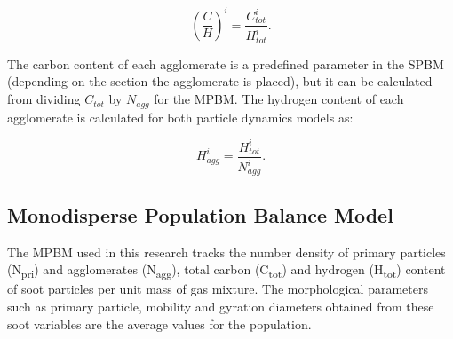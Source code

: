 \begin{equation}
	\left(
		\frac{C}{H}
	\right)^i
	=\frac{C^i_{tot}}{H^i_{tot}}   
	\label{eqn:CtoH}.
\end{equation}

The carbon content of each agglomerate is a predefined parameter in the SPBM (depending on the section the agglomerate is placed), but it can be calculated from dividing ${C_{tot}}$ by ${N_{agg}}$ for the MPBM. The hydrogen content of each agglomerate is calculated for both particle dynamics models as:

\begin{equation}
	H^i_{agg}
	=\frac{H^i_{tot}}{N^i_{agg}}   
	\label{eqn:Hagg}.
\end{equation}


\subsection{Monodisperse Population Balance Model}
The MPBM used in this research tracks the number density of primary particles (N\textsubscript{pri}) and agglomerates (N\textsubscript{agg}), total carbon (C\textsubscript{tot}) and hydrogen (H\textsubscript{tot}) content of soot particles per unit mass of gas mixture. The morphological parameters such as primary particle, mobility and gyration diameters obtained from these soot variables are the average values for the population.

